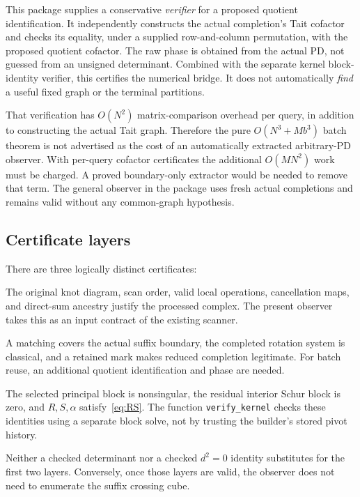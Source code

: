 \documentclass[11pt]{article}
\theoremstyle{definition}
\theoremstyle{remark}
\newcommand{\code}[1]{\texttt{#1}}
\begin{document}
This package supplies a conservative \emph{verifier} for a proposed quotient
identification. It independently constructs the actual completion's Tait
cofactor and checks its equality, under a supplied row-and-column
permutation, with the proposed quotient cofactor. The raw phase is obtained
from the actual PD, not guessed from an unsigned determinant. Combined with
the separate kernel block-identity verifier, this certifies the numerical
bridge. It does not automatically \emph{find} a useful fixed graph or the
terminal partitions.

That verification has $O(N^2)$ matrix-comparison overhead per query, in
addition to constructing the actual Tait graph. Therefore the pure
$O(N^3+Mb^3)$ batch theorem is not advertised as the cost of an automatically
extracted arbitrary-PD observer. With per-query cofactor certificates the
additional $O(MN^2)$ work must be charged. A proved boundary-only extractor
would be needed to remove that term. The general observer in the package
uses fresh actual completions and remains valid without any common-graph
hypothesis.

\subsection{Certificate layers}
There are three logically distinct certificates:
\begin{description}[style=nextline]
\item[Relative chain provenance.]
The original knot diagram, scan order, valid local operations, cancellation
maps, and direct-sum ancestry justify the processed complex. The present
observer takes this as an input contract of the existing scanner.
\item[Completion geometry.]
A matching covers the actual suffix boundary, the completed rotation system
is classical, and a retained mark makes reduced completion legitimate.
For batch reuse, an additional quotient identification and phase are needed.
\item[Exact linear algebra.]
The selected principal block is nonsingular, the residual interior Schur
block is zero, and $R,S,\alpha$ satisfy~\eqref{eq:RS}. The function
\code{verify\_kernel} checks these identities using a separate block solve,
not by trusting the builder's stored pivot history.
\end{description}
Neither a checked determinant nor a checked $d^2=0$ identity substitutes for
the first two layers. Conversely, once those layers are valid, the observer
does not need to enumerate the suffix crossing cube.
\end{document}
